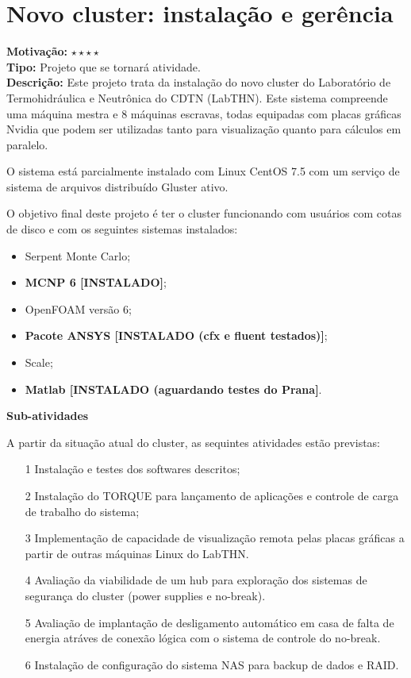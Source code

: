 \chapter{Novo cluster: instalação e gerência}

\textbf{Motivação:} $\star\star\star\star$\\

\textbf{Tipo:} Projeto que se tornará atividade.\\

\textbf{Descrição:} Este projeto trata da instalação do novo cluster do Laboratório 
de Termohidráulica e Neutrônica do CDTN (LabTHN). Este sistema compreende uma máquina mestra e 8 máquinas escravas, todas equipadas com placas gráficas Nvidia que podem ser utilizadas tanto para visualização quanto para cálculos em paralelo.

O sistema está parcialmente instalado com Linux CentOS 7.5 com um serviço de 
sistema de arquivos distribuído Gluster ativo. 

O objetivo final deste projeto é ter o cluster funcionando com usuários com cotas 
de disco e com os seguintes sistemas instalados:

\begin{itemize}
	\item Serpent Monte Carlo;
	\item \textbf{MCNP 6 [INSTALADO]};
	\item OpenFOAM versão 6;
	\item \textbf{Pacote ANSYS [INSTALADO (cfx e fluent testados)]};
	\item Scale;
	\item \textbf{Matlab [INSTALADO (aguardando testes do Prana]}.
\end{itemize}

\textbf{Sub-atividades}

A partir da situação atual do cluster, as sequintes atividades estão previstas:
\begin{itemize}
	\item[1] Instalação e testes dos softwares descritos;
	\item[2] Instalação do TORQUE para lançamento de aplicações e controle de 
	carga de trabalho do sistema;
	\item[3] Implementação de capacidade de visualização remota pelas placas gráficas a partir de outras máquinas Linux do LabTHN.
	\item[4] Avaliação da viabilidade de um hub para exploração dos sistemas de segurança do cluster (power supplies e no-break).
	\item[5] Avaliação de implantação de desligamento automático em casa de falta de energia atráves de conexão lógica com o sistema de controle do no-break.
	\item[6] Instalação de configuração do sistema NAS para backup de dados e RAID.
\end{itemize}

